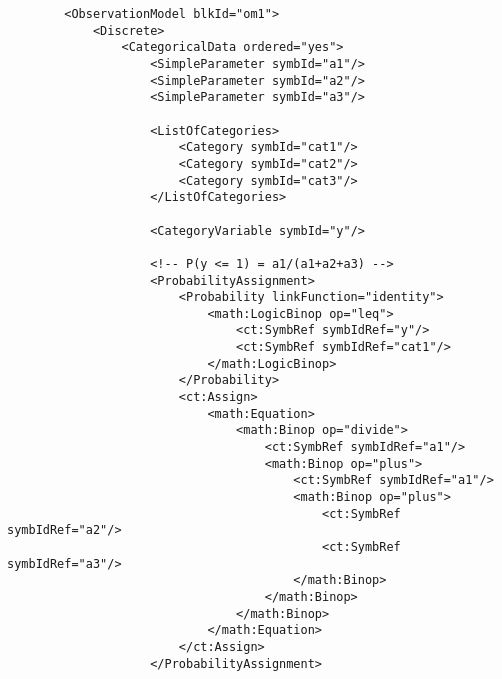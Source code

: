 \lstset{language=XML}
\begin{lstlisting}
        <ObservationModel blkId="om1">
            <Discrete>
                <CategoricalData ordered="yes">
                    <SimpleParameter symbId="a1"/>
                    <SimpleParameter symbId="a2"/>
                    <SimpleParameter symbId="a3"/>
                    
                    <ListOfCategories> 
                        <Category symbId="cat1"/>
                        <Category symbId="cat2"/>
                        <Category symbId="cat3"/>
                    </ListOfCategories>
                    
                    <CategoryVariable symbId="y"/>
                    
                    <!-- P(y <= 1) = a1/(a1+a2+a3) --> 
                    <ProbabilityAssignment>
                        <Probability linkFunction="identity">
                            <math:LogicBinop op="leq">
                                <ct:SymbRef symbIdRef="y"/>
                                <ct:SymbRef symbIdRef="cat1"/>
                            </math:LogicBinop>
                        </Probability>
                        <ct:Assign>
                            <math:Equation>
                                <math:Binop op="divide">
                                    <ct:SymbRef symbIdRef="a1"/>
                                    <math:Binop op="plus">
                                        <ct:SymbRef symbIdRef="a1"/>
                                        <math:Binop op="plus">
                                            <ct:SymbRef symbIdRef="a2"/>
                                            <ct:SymbRef symbIdRef="a3"/>
                                        </math:Binop>
                                    </math:Binop>
                                </math:Binop>
                            </math:Equation>
                        </ct:Assign>
                    </ProbabilityAssignment>
                    

\end{lstlisting}
